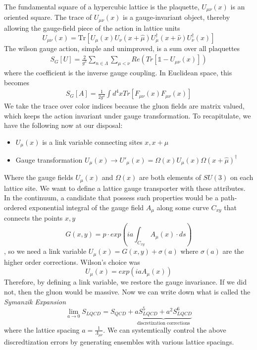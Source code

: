     
The fundamental square of a hypercubic lattice is the plaquette, $U_{\mu\nu}(x)$ is an oriented square. The trace of  $U_{\mu\nu}(x)$ is a gauge-invariant object, thereby allowing the gauge-field piece of the action in lattice units  
\begin{equation}
    U_{\mu\nu}(x) = \text{Tr} \left[ U_\mu(x) U_\nu(x + \hat{\mu}) U_\mu^\dagger(x + \hat{\nu}) U_\nu^\dagger(x) \right]
\end{equation}
The wilson gauge action, simple and unimproved, is a sum over all plaquettes
\begin{align}
    S_G[U] = \frac{2}{g^2} \sum_{n\in\Lambda}^{}\sum_{\mu < \nu}^{} Re\left(Tr\left[\mathbb{1} - U_{\mu\nu}(x)\right]\right)
\end{align}
where the coefficient is the inverse gauge coupling. 
In Euclidean space, this becomes 
\begin{align}
    S_G[A] = \frac{1}{2g^2} \int d^4x Tr\left[F_{\mu\nu}(x) F_{\mu\nu}(x)\right]
\end{align}
We take the trace over color indices because the gluon fields are matrix valued, which keeps the action invariant under gauge transformation. To recapitulate, we have the following now at our disposal:
\begin{itemize}
    \item $U_\mu(x)$ is a link variable connecting sites $x, x+\mu$ 
    \item Gauge transformation $U_\mu(x) \to U'_\mu(x) = \Omega(x)U_\mu(x)\Omega(x+\hat{\mu})^\dagger$
\end{itemize}
Where the gauge fields $U_\mu(x)$ and $\Omega(x)$ are both elements of $SU(3)$ on each lattice site. 
We want to define a lattice gauge transporter with these attributes. In the continuum, a candidate that possess such properties would be a path-ordered exponential integral of the gauge field $A_\mu$ along some curve $C_{xy}$ that connects the points $x,y$ 
\begin{equation}
    G(x,y) = p\cdot exp\left(ia\int_{C_{xy}}^{}A_\mu(x) \cdot ds\right)
\end{equation},
so we need a link variable $U_\mu(x) = G(x,y) + \sigma(a)$ where $\sigma(a)$ are the higher order corrections. Wilson's choice was 
\begin{equation}
    U_\mu(x) = exp\left(iaA_\mu(x)\right)
\end{equation}
Therefore, by defining a link variable, we restore the gauge invariance. If we did not, then the gluon would be massive. Now we can write down what is called the \textit{Symanzik Expansion} 
\begin{equation}
    \lim\limits_{a \to 0} S_{LQCD} = S_{QCD} + \underbrace{aS_{LQCD}^5 + a^2 S^6_{LQCD}}_{\text{discretization corrections}}
\end{equation} where the lattice spacing $a = \frac{1}{\Lambda_{\mu\nu}}$. We can systemtically control the above discredtization errors by generating ensembles with various lattice spacings. 

